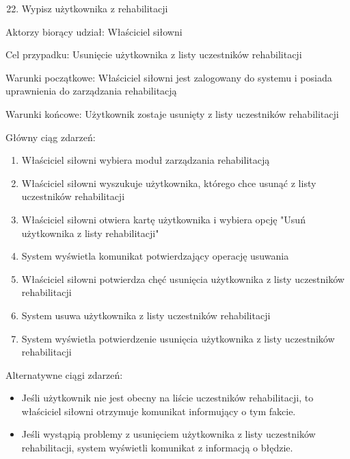 {}

{}

{}

\begin{enumerate}
\setcounter{enumi}{21}
\tightlist
\item
  {Wypisz użytkownika z rehabilitacji}
\end{enumerate}

{Aktorzy biorący udział: Właściciel siłowni}

{Cel przypadku: Usunięcie użytkownika z listy uczestników rehabilitacji}

{Warunki początkowe: Właściciel siłowni jest zalogowany do systemu i
posiada uprawnienia do zarządzania rehabilitacją}

{Warunki końcowe: Użytkownik zostaje usunięty z listy uczestników
rehabilitacji}

{Główny ciąg zdarzeń:}

\begin{enumerate}
\tightlist
\item
  {Właściciel siłowni wybiera moduł zarządzania rehabilitacją}
\item
  {Właściciel siłowni wyszukuje użytkownika, którego chce usunąć z listy
  uczestników rehabilitacji}
\item
  {Właściciel siłowni otwiera kartę użytkownika i wybiera opcję "Usuń
  użytkownika z listy rehabilitacji"}
\item
  {System wyświetla komunikat potwierdzający operację usuwania}
\item
  {Właściciel siłowni potwierdza chęć usunięcia użytkownika z listy
  uczestników rehabilitacji}
\item
  {System usuwa użytkownika z listy uczestników rehabilitacji}
\item
  {System wyświetla potwierdzenie usunięcia użytkownika z listy
  uczestników rehabilitacji}
\end{enumerate}

{Alternatywne ciągi zdarzeń:}

\begin{itemize}
\tightlist
\item
  {Jeśli użytkownik nie jest obecny na liście uczestników rehabilitacji,
  to właściciel siłowni otrzymuje komunikat informujący o tym fakcie.}
\item
  {Jeśli wystąpią problemy z usunięciem użytkownika z listy uczestników
  rehabilitacji, system wyświetli komunikat z informacją o błędzie.}
\end{itemize}

